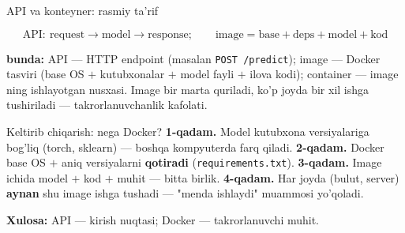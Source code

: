\documentclass[aspectratio=169,11pt]{beamer}
\newcommand{\bunda}[1]{{\small\textbf{bunda:}\; #1}}
\begin{document}
\begin{frame}{API va konteyner: rasmiy ta'rif}
  \begin{tcolorbox}[defbox,title={Ta'rif: xizmat va konteyner}]
    \vspace{-0.4em}
    $$ \text{API}:\ \text{request} \rightarrow \text{model} \rightarrow \text{response};
       \qquad \text{image} = \text{base} + \text{deps} + \text{model} + \text{kod} $$
  \end{tcolorbox}
  \vspace{2pt}
  \bunda{API --- HTTP endpoint (masalan \texttt{POST /predict}); image --- Docker
  tasviri (base OS $+$ kutubxonalar $+$ model fayli $+$ ilova kodi); container ---
  image ning ishlayotgan nusxasi.}
  \vspace{4pt}
  \footnotesize Image bir marta quriladi, ko'p joyda bir xil ishga tushiriladi ---
  takrorlanuvchanlik kafolati.
\end{frame}

\begin{frame}{Keltirib chiqarish: nega Docker?}
  \textbf{1-qadam.} Model kutubxona versiyalariga bog'liq (torch, sklearn) ---
  boshqa kompyuterda farq qiladi.
  \pause
  \textbf{2-qadam.} Docker base OS $+$ aniq versiyalarni \textbf{qotiradi}
  (\texttt{requirements.txt}).
  \pause
  \textbf{3-qadam.} Image ichida model $+$ kod $+$ muhit --- bitta birlik.
  \pause
  \textbf{4-qadam.} Har joyda (bulut, server) \textbf{aynan} shu image ishga
  tushadi --- "menda ishlaydi" muammosi yo'qoladi.
  \begin{tcolorbox}[okbox,top=2pt,bottom=2pt]
    \small \textbf{Xulosa:} API --- kirish nuqtasi; Docker --- takrorlanuvchi muhit.
  \end{tcolorbox}
\end{frame}
\end{document}
